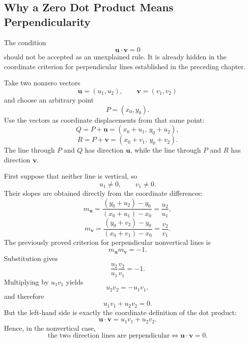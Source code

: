 \subsection{Why a Zero Dot Product Means Perpendicularity}

The condition
\[
\mathbf u\cdot\mathbf v=0
\]
should not be accepted as an unexplained rule.  It is already hidden in the
coordinate criterion for perpendicular lines established in the preceding
chapter.

Take two nonzero vectors
\[
\mathbf u=(u_1,u_2),
\qquad
\mathbf v=(v_1,v_2)
\]
and choose an arbitrary point
\[
P=(x_0,y_0).
\]
Use the vectors as coordinate displacements from that same point:
\[
Q=P+\mathbf u=(x_0+u_1,\,y_0+u_2),
\]
\[
R=P+\mathbf v=(x_0+v_1,\,y_0+v_2).
\]
The line through $P$ and $Q$ has direction $\mathbf u$, while the line through
$P$ and $R$ has direction $\mathbf v$.

\begin{center}
\end{center}

First suppose that neither line is vertical, so
\[
u_1\neq0,
\qquad
v_1\neq0.
\]
Their slopes are obtained directly from the coordinate differences:
\[
m_{\mathbf u}
=
\frac{(y_0+u_2)-y_0}{(x_0+u_1)-x_0}
=
\frac{u_2}{u_1},
\]
\[
m_{\mathbf v}
=
\frac{(y_0+v_2)-y_0}{(x_0+v_1)-x_0}
=
\frac{v_2}{v_1}.
\]
The previously proved criterion for perpendicular nonvertical lines is
\[
m_{\mathbf u}m_{\mathbf v}=-1.
\]
Substitution gives
\[
\frac{u_2}{u_1}\frac{v_2}{v_1}=-1.
\]
Multiplying by $u_1v_1$ yields
\[
u_2v_2=-u_1v_1,
\]
and therefore
\[
u_1v_1+u_2v_2=0.
\]
But the left-hand side is exactly the coordinate definition of the dot product:
\[
\mathbf u\cdot\mathbf v=u_1v_1+u_2v_2.
\]
Hence, in the nonvertical case,
\[
\text{the two direction lines are perpendicular}
\iff
\mathbf u\cdot\mathbf v=0.
\]

